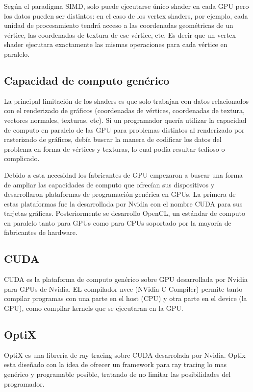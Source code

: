 \medskip
Según el paradigma SIMD, solo puede ejecutarse único shader en cada GPU pero los datos pueden ser distintos: en el caso de los vertex shaders, por ejemplo, cada unidad de procesamiento tendrá acceso a las coordenadas geométricas de un vértice, las coordenadas de textura de ese vértice, etc. Es decir que un vertex shader ejecutara exactamente las mismas operaciones para cada vértice en paralelo. 

\clearpage

\subsection{Capacidad de computo genérico}
La principal limitación de los shaders es que solo trabajan con datos relacionados con el renderizado de gráficos (coordenadas de vértices, coordenadas de textura, vectores normales, texturas, etc). Si un programador quería utilizar la capacidad de computo en paralelo de las GPU para problemas distintos al renderizado por rasterizado de gráficos, debía buscar la manera de codificar los datos del problema en forma de vértices y texturas, lo cual podía resultar tedioso o complicado.

\medskip
Debido a esta necesidad los fabricantes de GPU empezaron a buscar una forma de ampliar las capacidades de computo que ofrecían sus dispositivos y desarrollaron plataformas de programación genérica en GPUs. La primera de estas plataformas fue la desarrollada por Nvidia con el nombre CUDA para sus tarjetas gráficas. Posteriormente se desarrollo OpenCL, un estándar de computo en paralelo tanto para GPUs como para CPUs soportado por la mayoría de fabricantes de hardware.

\subsection{CUDA}

CUDA es la plataforma de computo genérico sobre GPU desarrollada por Nvidia para GPUs de Nvidia. EL compilador nvcc (NVidia C Compiler) permite tanto compilar programas con una parte en el host (CPU) y otra parte en el device (la GPU), como compilar kernels que se ejecutaran en la GPU.

\subsection{OptiX}

OptiX es una librería de ray tracing sobre CUDA desarrolada por Nvidia. Optix esta diseñado con la idea de ofrecer un framework para ray tracing lo mas genérico y programable posible, tratando de no limitar las posibilidades del programador.


